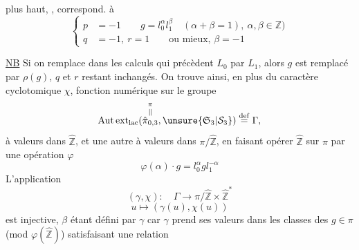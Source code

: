 plus haut,  , correspond.  à
\[
\left\{\begin{aligned}
p&=-1\qquad g=l_0^\alpha l_1^\beta\quad(\alpha+\beta=1),\ \alpha,\beta\in\mathbb Z)\\
q&=-1,\ r=1\qquad\text{ou mieux, }\beta=-1
\end{aligned}\right.
\]

\uline{NB} Si on remplace dans les calculs qui précèdent $L_0$ par $L_1$, alors $g$ est remplacé par $\rho(g)$, $q$ et $r$ restant inchangés. On trouve ainsi, en plus du caractère cyclotomique $\chi$,   fonction numérique \inserted{$\beta$} sur le groupe
\[
\operatorname{Aut\,ext}_{\mathrm{lac}}(\overset{\pi}{\overset{\Vert}{\hat\pi_{0,3}}},\unsure{\mathfrak S_3|\mathcal S_3})\overset{\mathrm{def}}=\Gamma,
\]
 à valeurs dans $\hat{\mathbb Z}$, et une autre \inserted{$\gamma$} à valeurs dans $\pi/\hat{\mathbb Z}$, en faisant opérer $\hat{\mathbb Z}$ sur $\pi$ par une opération $\varphi$
\[
\varphi(\alpha)\cdot g=l_0^\alpha gl_1^{-\alpha}
\]
L'application
\[
(\gamma,\chi):\quad\Gamma\longrightarrow\pi/\hat{\mathbb Z}\times\hat{\mathbb Z}^{*}
\]
\[
u\longmapsto(\gamma(u),\chi(u))
\]
est injective,  $\beta$ étant défini par $\gamma$ car $\gamma$ prend ses valeurs dans les classes des $g\in\pi$ (mod $\varphi(\hat{\mathbb Z})$) satisfaisant une relation
